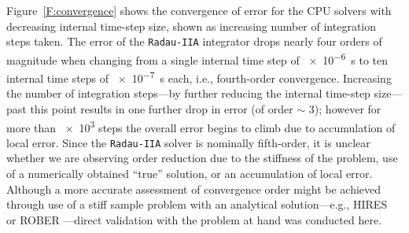\documentclass[preprint,review,11pt]{elsarticle}
\begin{document}
Figure~\ref{F:convergence} shows the convergence of error for the CPU solvers with decreasing internal time-step size, shown as increasing number of integration steps taken.
The error of the \texttt{Radau-IIA} integrator drops nearly four orders of magnitude when changing from a single internal time step of \SI{e-6}{\second} to ten internal time steps of \SI{e-7}{\second} each, i.e., fourth-order convergence.
Increasing the number of integration steps---by further reducing the internal time-step size---past this point results in one further drop in error (of order $\sim$ 3); however for more than \num{e3} steps the overall error begins to climb due to accumulation of local error.
Since the \texttt{Radau-IIA} solver is nominally fifth-order, it is unclear whether we are observing order reduction due to the stiffness of the problem, use of a numerically obtained ``true'' solution, or an accumulation of local error.
Although a more accurate assessment of convergence order might be achieved through use of a stiff sample problem with an analytical solution---e.g., HIRES~\cite{lioen1998test} or ROBER \cite{robertson1966solution}---direct validation with the problem at hand was conducted here.
\end{document}
